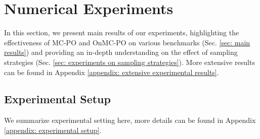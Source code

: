 

\section{Numerical Experiments}
\label{sec: numerical experiments}
In this section, we present main results of our experiments, highlighting the effectiveness of MC-PO and OnMC-PO on various benchmarks (Sec. \ref{sec: main results}) and providing an in-depth understanding on the effect of sampling strategies (Sec. \ref{sec: experiments on sampling strategies}).
More extensive results can be found in Appendix \ref{appendix: extensive experimental results}.

\subsection{Experimental Setup}
\label{sec: experimental setup}
We summarize experimental setting here, more details can be found in Appendix \ref{appendix: experimental setup}.
